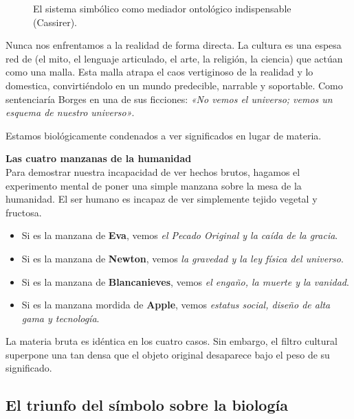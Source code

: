 \begin{figure}[htbp]
    \centering
    
    \caption{El sistema simbólico como mediador ontológico indispensable (Cassirer).}
    \label{fig:filtro_simbolico}
\end{figure}

Nunca nos enfrentamos a la realidad de forma directa. La cultura es una espesa red de \FormasSimbolicas{} (el mito, el lenguaje articulado, el arte, la religión, la ciencia) que actúan como una malla. Esta malla atrapa el caos vertiginoso de la realidad y lo domestica, convirtiéndolo en un mundo predecible, narrable y soportable. Como sentenciaría Borges en una de sus ficciones: \textit{«No vemos el universo; vemos un esquema de nuestro universo»}.

Estamos biológicamente condenados a ver significados en lugar de materia. 

\begin{ejemplo}
\textbf{Las cuatro manzanas de la humanidad}\\
Para demostrar nuestra incapacidad de ver hechos brutos, hagamos el experimento mental de poner una simple manzana sobre la mesa de la humanidad. El ser humano es incapaz de ver simplemente tejido vegetal y fructosa. 
\begin{itemize}
    \item Si es la manzana de \textbf{Eva}, vemos \textit{el Pecado Original y la caída de la gracia}.
    \item Si es la manzana de \textbf{Newton}, vemos \textit{la gravedad y la ley física del universo}.
    \item Si es la manzana de \textbf{Blancanieves}, vemos \textit{el engaño, la muerte y la vanidad}.
    \item Si es la manzana mordida de \textbf{Apple}, vemos \textit{estatus social, diseño de alta gama y tecnología}.
\end{itemize}
La materia bruta es idéntica en los cuatro casos. Sin embargo, el filtro cultural superpone una \FormaSimbolica{} tan densa que el objeto original desaparece bajo el peso de su significado.
\end{ejemplo}

\subsection{El triunfo del símbolo sobre la biología}

